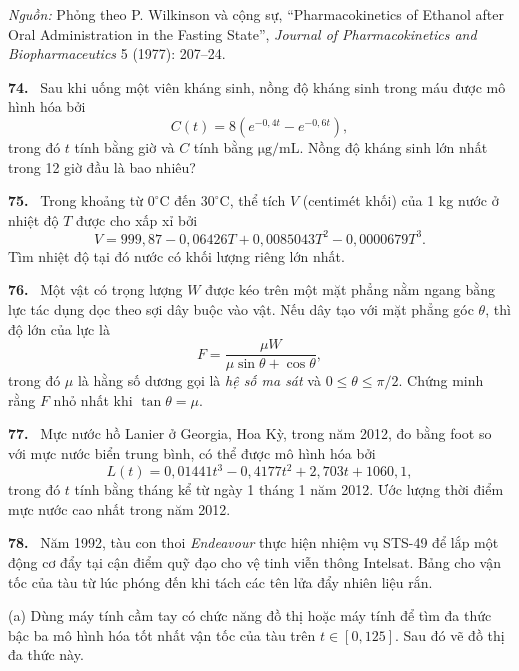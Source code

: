 \documentclass[12pt,a4paper]{article}
\newcommand{\bt}[1]{\par\smallskip\Needspace{5\baselineskip}\noindent\textbf{#1.}\ }
\begin{document}
\noindent\textit{Nguồn:} Phỏng theo P. Wilkinson và cộng sự, “Pharmacokinetics of Ethanol after Oral Administration in the Fasting State”, \textit{Journal of Pharmacokinetics and Biopharmaceutics} 5 (1977): 207–24.
\bt{74} Sau khi uống một viên kháng sinh, nồng độ kháng sinh trong máu được mô hình hóa bởi
\[C(t)=8\left(e^{-0{,}4t}-e^{-0{,}6t}\right),\]
trong đó $t$ tính bằng giờ và $C$ tính bằng $\mathrm{\mu g/mL}$. Nồng độ kháng sinh lớn nhất trong 12 giờ đầu là bao nhiêu?
\bt{75} Trong khoảng từ $0^\circ\mathrm C$ đến $30^\circ\mathrm C$, thể tích $V$ (centimét khối) của 1 kg nước ở nhiệt độ $T$ được cho xấp xỉ bởi
\[V=999{,}87-0{,}06426T+0{,}0085043T^2-0{,}0000679T^3.\]
Tìm nhiệt độ tại đó nước có khối lượng riêng lớn nhất.
\bt{76} Một vật có trọng lượng $W$ được kéo trên một mặt phẳng nằm ngang bằng lực tác dụng dọc theo sợi dây buộc vào vật. Nếu dây tạo với mặt phẳng góc $\theta$, thì độ lớn của lực là
\[F=\frac{\mu W}{\mu\sin\theta+\cos\theta},\]
trong đó $\mu$ là hằng số dương gọi là \textit{hệ số ma sát} và $0\le\theta\le\pi/2$. Chứng minh rằng $F$ nhỏ nhất khi $\tan\theta=\mu$.
\bt{77} Mực nước hồ Lanier ở Georgia, Hoa Kỳ, trong năm 2012, đo bằng foot so với mực nước biển trung bình, có thể được mô hình hóa bởi
\[L(t)=0{,}01441t^3-0{,}4177t^2+2{,}703t+1060{,}1,\]
trong đó $t$ tính bằng tháng kể từ ngày 1 tháng 1 năm 2012. Ước lượng thời điểm mực nước cao nhất trong năm 2012.
\bt{78} Năm 1992, tàu con thoi \textit{Endeavour} thực hiện nhiệm vụ STS-49 để lắp một động cơ đẩy tại cận điểm quỹ đạo cho vệ tinh viễn thông Intelsat. Bảng cho vận tốc của tàu từ lúc phóng đến khi tách các tên lửa đẩy nhiên liệu rắn.

(a) Dùng máy tính cầm tay có chức năng đồ thị hoặc máy tính để tìm đa thức bậc ba mô hình hóa tốt nhất vận tốc của tàu trên $t\in[0,125]$. Sau đó vẽ đồ thị đa thức này.
\end{document}
